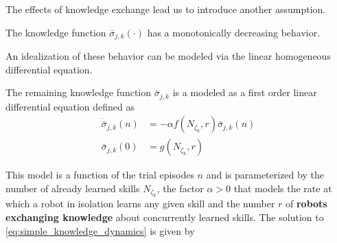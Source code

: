The effects of knowledge exchange lead us to introduce another assumption.
\begin{tcolorbox}
	\begin{assumption}\label{assumption:exponential_decrease} The knowledge function $\bar{\sigma}_{j,k}(\cdot)$ has a monotonically decreasing behavior.
	\end{assumption}
\end{tcolorbox} 
\noindent

An idealization of these behavior can be modeled via the linear homogeneous differential equation.
\begin{tcolorbox}
	\begin{definition}\label{assumption:ode_model}
		The remaining knowledge function $\bar{\sigma}_{j,k}$ is a modeled as a first order linear differential equation defined as
		\begin{subequations}\label{eq:simple_knowledge_dynamics}
			\begin{alignat}{2}
				\dot{\bar{\sigma}}_{j,k}\left(n\right) &= -\alpha f\left(N_{\zeta_k},r\right) \bar{\sigma}_{j,k}\left(n\right)\\
				\bar{\sigma}_{j,k}(0) &= g\left(N_{\zeta_k},r\right)
			\end{alignat}
		\end{subequations}
	\end{definition}
\end{tcolorbox} 
This model is a function of the trial episodes $n$ and is parameterized by the number of already learned skills $N_{\zeta_k}$, the factor $ \alpha>0$ that models the rate at which a robot in isolation learns any given skill and the number $r$ of \textbf{robots exchanging knowledge} about concurrently learned skills. The solution to \eqref{eq:simple_knowledge_dynamics} is given by
